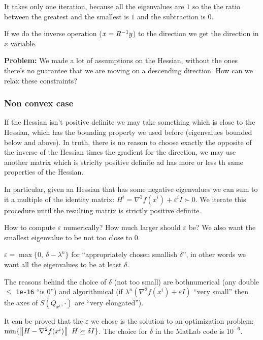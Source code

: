 \documentclass[computational_mathematics.tex]{subfiles}
\begin{document}
It takes only one iteration, because all the eigenvalues are $1$ so the the ratio between the greatest and the smallest is $1$ and the subtraction is $0$.

If we do the inverse operation ($x = {R}^{-1} y$) to the direction we get the direction in $x$ variable.

\begin{myframe}{\bf Problem:}
We made a lot of assumptions on the Hessian, without the ones there's no guarantee that we are moving on a descending direction. How can we relax these constraints?
\end{myframe}

\subsubsection{Non convex case}

If the Hessian isn't positive definite we may take something which is close to the Hessian, which has the bounding property we used before (eigenvalues bounded below and above). In truth, there is no reason to choose exactly the opposite of the inverse of the Hessian times the gradient for the direction, we may use another matrix which is striclty positive definite ad has more or less th same properties of the Hessian.

In particular, given an Hessian that has some negative eigenvalues we can sum to it a multiple of the identity matrix: $H^i = \nabla^2 f(x^i) + \varepsilon^i I \succ 0$. We iterate this procedure until the resulting matrix is strictly positive definite.

How to compute $\varepsilon$ numerically? How much larger should $\varepsilon$ be? We also want the smallest eigenvalue to be not too close to $0$.

 $\varepsilon = \max \{0,~  \delta - \lambda^n\}$ for ``appropriately chosen smallish $\delta$'', in other words we want all the eigenvalues to be at least $\delta$.

 The reasons behind the choice of $\delta$ (not too small) are bothnumerical (any double $\leq$ {\tt 1e-16} ``is $0$'') and algorithmical (if $\lambda^n(\nabla^2 f(x^i) + \varepsilon I)$ ``very small'' then the axes of $S(Q_{x^i}, \cdot)$ are ``very elongated'').

 It can be proved that the $\varepsilon$ we chose is the solution to an optimization problem: $\min \{\left\lVert H - \nabla^2 f(x^i)\right\rVert ~ H \succeq \delta I\}$. The choice for $\delta$ in the MatLab code is $10^{-6}$.
\end{document}
